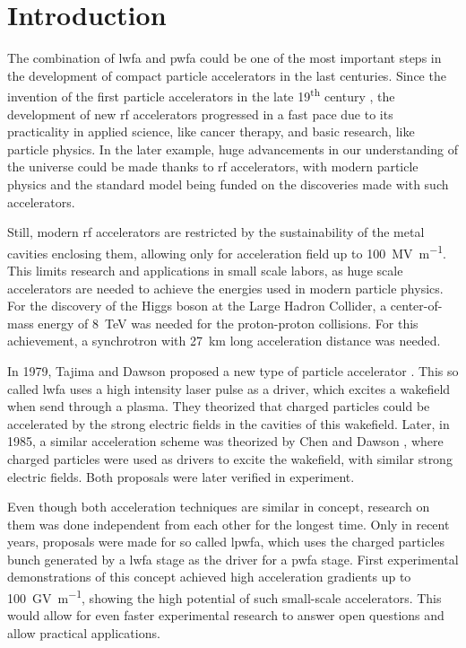 \documentclass[bachelor_thesis]{subfiles}
\begin{document}
\chapter{Introduction}
The combination of \gls{lwfa} and \gls{pwfa} could be one of the most important steps in the development of compact particle accelerators in the last centuries.
Since the invention of the first particle accelerators in the late 19\textsuperscript{th} century \cite{Malka2016}, the development of new \gls{rf} accelerators progressed in a fast pace
due to its practicality in applied science, like cancer therapy, and basic research, like particle physics. In the later example, huge advancements in our understanding of the universe
could be made thanks to \gls{rf} accelerators, with modern particle physics and the standard model being funded on the discoveries made with such accelerators.

Still, modern \gls{rf} accelerators are restricted by the sustainability of the metal cavities enclosing them, allowing only for acceleration field up to \qty{100}{\mega\volt\per\m}.
This limits research and applications in small scale labors, as huge scale accelerators are needed to achieve the energies used in modern particle physics.
For the discovery of the Higgs boson at the Large Hadron Collider, a center-of-mass energy of \qty{8}{\TeV} \cite{Aad2012} was needed for the proton-proton collisions.
For this achievement, a synchrotron with \qty{27}{\km} long acceleration distance was needed.

In 1979, Tajima and Dawson proposed a new type of particle accelerator \cite{Tajima1979}. This so called \gls{lwfa} uses a high intensity laser pulse as a driver, which excites a wakefield
when send through a plasma. They theorized that charged particles could be accelerated by the strong electric fields in the cavities of this wakefield.
Later, in 1985, a similar acceleration scheme was theorized by Chen and Dawson \cite{Chen1985}, where charged particles were used as drivers to excite the wakefield, with similar strong electric fields.
Both proposals were later verified in experiment. 

Even though both acceleration techniques are similar in concept, research on them was done independent from each other for the longest time. Only in recent years, 
proposals \cite{Ossa2019} were made for so called \gls{lpwfa}, which uses the charged particles bunch generated by a \gls{lwfa} stage as the driver for a \gls{pwfa} stage.
First experimental demonstrations of this concept \cite{Kurz2021} achieved high acceleration gradients up to \qty{100}{\giga\volt\per\m}, showing the high potential of
such small-scale accelerators. This would allow for even faster experimental research to answer open questions and allow practical applications.
\end{document}
